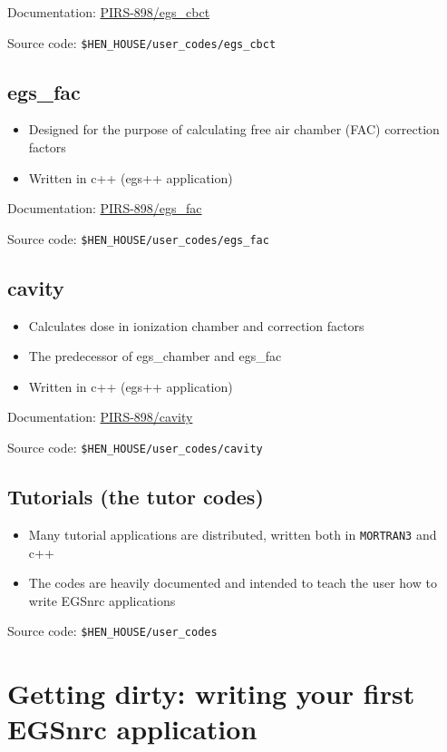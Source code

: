 \documentclass[12pt,twoside]{article}
\begin{document}
Documentation: \href{http://nrc-cnrc.github.io/EGSnrc/doc/pirs898/egs\_cbct.html}{PIRS-898/egs\_cbct}

Source code: \Verb+$HEN_HOUSE/user_codes/egs_cbct+

\subsection{egs\_fac}
\begin{itemize}
\item Designed for the purpose of calculating free air chamber (FAC) correction factors
\item Written in c++ (egs++ application)
\end{itemize}

Documentation: \href{http://nrc-cnrc.github.io/EGSnrc/doc/pirs898/egs\_fac.html}{PIRS-898/egs\_fac}

Source code: \Verb+$HEN_HOUSE/user_codes/egs_fac+

\subsection{cavity}
\begin{itemize}
\item Calculates dose in ionization chamber and correction factors
\item The predecessor of egs\_chamber and egs\_fac
\item Written in c++ (egs++ application)
\end{itemize}

Documentation: \href{http://nrc-cnrc.github.io/EGSnrc/doc/pirs898/cavity.html}{PIRS-898/cavity}

Source code: \Verb+$HEN_HOUSE/user_codes/cavity+

\subsection{Tutorials (the tutor codes)}
\begin{itemize}
\item Many tutorial applications are distributed, written both in \Verb+MORTRAN3+ and c++
\item The codes are heavily documented and intended to teach the user how to write EGSnrc applications
\end{itemize}

Source code: \Verb+$HEN_HOUSE/user_codes+


\clearpage
\section{Getting dirty: writing your first EGSnrc application}
\label{myapp}
\end{document}
